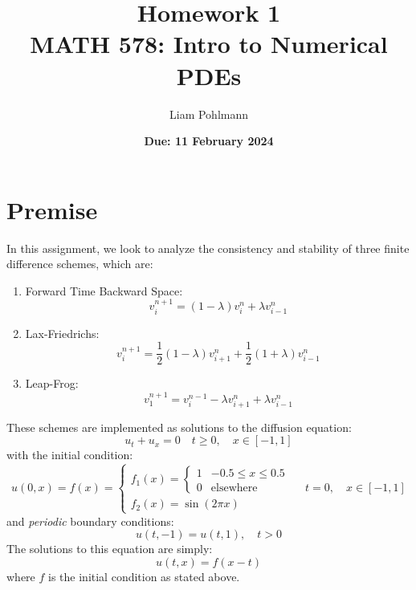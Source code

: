 \documentclass{hw_report}
\title{\textbf{Homework 1}\\ \vspace{1em}
MATH 578: Intro to Numerical PDEs}
\author[1]{Liam Pohlmann}
\affil[1]{University of New Mexico, Department of Nuclear Engineering}
\date{\textbf{Due: 11 February 2024}}
\begin{document}
    \maketitle
    \tableofcontents
    \clearpage


    \section*{Premise}
    In this assignment, we look to analyze the consistency and stability of three finite difference schemes, which are:
    \begin{enumerate}
        \item Forward Time Backward Space: \begin{equation}
                                               \tag{A} \label{scheme A}
                                               v^{n+1}_i = (1-\lambda)v_i^n+\lambda v_{i-1}^n
        \end{equation}
        \item Lax-Friedrichs: \begin{equation}
                                  \tag{B} \label{scheme B}
                                  v_i^{n+1} = \frac{1}{2}(1-\lambda)v_{i+1}^n + \frac{1}{2}(1+\lambda)v_{i-1}^n
        \end{equation}
        \item Leap-Frog: \begin{equation}
                             \tag{C} \label{scheme C}
                             v_1^{n+1} = v_i^{n-1}-\lambda v_{i+1}^n +\lambda v_{i-1}^n
        \end{equation}
    \end{enumerate}
    These schemes are implemented as solutions to the diffusion equation:
    \begin{equation}
        u_t +u_x = 0 \quad t\geq 0, \quad x\in [-1,1]
    \end{equation}
    with the initial condition:
    \begin{equation*}
        u(0,x) = f(x) = \begin{cases}
                            f_1(x) = \begin{cases}
                                         1& -0.5\leq x \leq 0.5 \\
                                         0 & \text{elsewhere}
                            \end{cases} \\
                            f_2(x) = \sin(2\pi x)
        \end{cases}
        \quad t=0,\quad x\in [-1,1]
    \end{equation*}
    and \textit{periodic} boundary conditions:
    \begin{equation*}
        u(t,-1)=u(t,1),\quad t>0
    \end{equation*}
    The solutions to this equation are simply:
    \begin{equation} \label{u_exact}
        u(t,x) = f(x-t)
    \end{equation}
    where $f$ is the initial condition as stated above.
\end{document}
